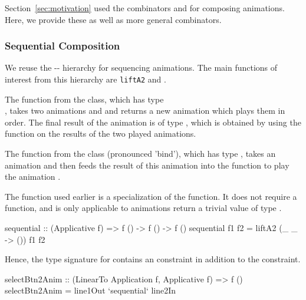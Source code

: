 Section~\ref{sec:motivation} used the combinators  and
 for composing animations. Here, we provide these as well as more
general combinators.



\subsubsection{Sequential Composition}

We reuse the -- hierarchy for
sequencing animations. The main functions of interest from this hierarchy are \texttt{liftA2} and \hs{>>=}.

The  function from the  class, which has type \\, takes two animations  and  and returns a new animation which plays them in order. The final result of the animation is of type , which is obtained by using the function  on the results of the two played animations.

The \hs{>>=} function from the  class (pronounced 'bind'), which has type , takes an animation  and then feeds the result of this animation into the function  to play the animation .


The  function used earlier is a specialization of the  function. It does not require a  function, and is only applicable to animations return a trivial value of type \hs{()}.

\begin{code}
sequential :: (Applicative f) => f () -> f () -> f ()
sequential f1 f2 = liftA2 (\_ _ -> ()) f1 f2
\end{code}

Hence, the type signature for  contains an 
 constraint in addition to the 
constraint.

\begin{code}
selectBtn2Anim :: (LinearTo Application f, Applicative f) => f ()
selectBtn2Anim = line1Out `sequential` line2In
\end{code}

